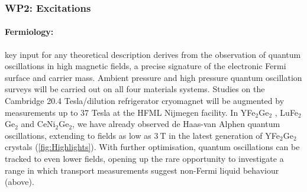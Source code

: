 

\subsubsection*{WP2: Excitations}



\paragraph{Fermiology:}
key input for any
theoretical description derives from the observation of quantum oscillations in high magnetic fields, a precise signature of the electronic Fermi surface and
carrier mass. Ambient pressure and high pressure quantum oscillation surveys will be carried out on all four materials systems.
Studies on the Cambridge 20.4 Tesla/dilution refrigerator cryomagnet will be augmented by measurements up to 37 Tesla at the HFML Nijmegen facility.
In YFe$_2$Ge$_2$ , LuFe$_2$Ge$_2$ and CeNi$_2$Ge$_2$, we have already observed de Haas-van Alphen quantum oscillations, extending to fields as low as $\SI{3}{\tesla}$ in the latest generation of YFe$_2$Ge$_2$ crystals (\autoref{fig:Highlights}). With further optimisation, quantum oscillations can be tracked to even lower fields, opening up the rare opportunity to investigate a range in which transport measurements suggest non-Fermi liquid behaviour (above). 



